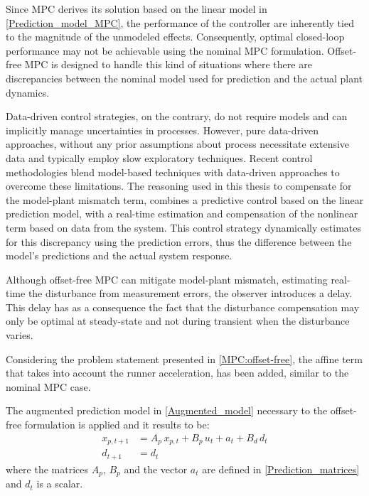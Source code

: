 \documentclass[a4paper,12pt,oneside]{book}
\begin{document}
\bigskip
Since MPC derives its solution based on the linear model in \eqref{Prediction_model_MPC}, the performance of the controller are inherently tied to the magnitude of the unmodeled effects.
Consequently, optimal closed-loop performance may not be achievable using the nominal MPC formulation. 
Offset-free MPC is designed to handle this kind of situations where there are discrepancies between the nominal model used for prediction and the actual plant dynamics. 

\bigskip
Data-driven control strategies, on the contrary, do not require models and can implicitly manage uncertainties in processes. 
However, pure data-driven approaches, without any prior assumptions about process necessitate extensive data and typically employ slow exploratory techniques.
Recent control methodologies blend model-based techniques with data-driven approaches to overcome these limitations.
The reasoning used in this thesis to compensate for the model-plant mismatch term, combines a predictive control based on the linear prediction model, with a real-time estimation and compensation of the nonlinear term based on data from the system.
This control strategy dynamically estimates for this discrepancy using the prediction errors, thus the difference between the model's predictions and the actual system response.

Although offset-free MPC can mitigate model-plant mismatch, estimating real-time the disturbance from measurement errors, the observer introduces a delay. 
This delay has as a consequence the fact that the disturbance compensation may only be optimal at steady-state and not during transient when the disturbance varies.

\bigskip
Considering the problem statement presented in \eqref{MPC:offset-free}, the affine term that takes into account the runner acceleration, has been added, similar to the nominal MPC case.

The augmented prediction model in \eqref{Augmented_model} necessary to the offset-free formulation is applied and it results to be:
\begin{equation}
\begin{aligned}
	x_{p,t+1} & = A_p \, x_{p,t} + B_p \, u_t + a_t + B_d \, d_t \\
    	d_{t+1} & = d_t
\end{aligned}
\label{Offset-free_prediction_model_MPC}
\end{equation}
where the matrices $A_p$, $B_p$ and the vector $a_t$ are defined in \eqref{Prediction_matrices} and $d_t$ is a scalar.
\end{document}
